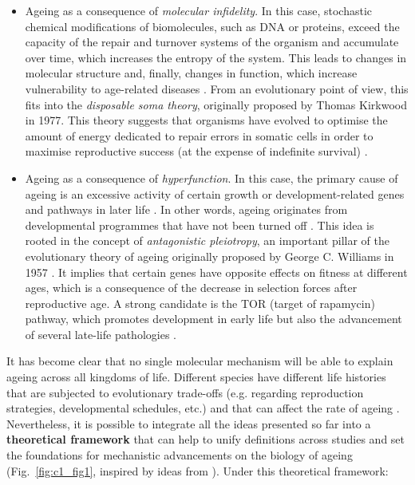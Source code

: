 \begin{itemize}
	
	\item Ageing as a consequence of \textit{molecular infidelity}. In this case, stochastic chemical modifications of biomolecules, such as DNA or proteins, exceed the capacity of the repair and turnover systems of the organism and accumulate over time, which increases the entropy of the system. This leads to changes in molecular structure and, finally, changes in function, which increase vulnerability to age-related diseases \cite{Hayflick2007,Hayflick2007a}. From an evolutionary point of view, this fits into the \textit{disposable soma theory}, originally proposed by Thomas Kirkwood in 1977. This theory suggests that organisms have evolved to optimise the amount of energy dedicated to repair errors in somatic cells in order to maximise reproductive success (at the expense of indefinite survival) \cite{Kirkwood1977,Kirkwood1991}. 
	
	\item Ageing as a consequence of \textit{hyperfunction}. In this case, the primary cause of ageing is an excessive activity of certain growth or development-related genes and pathways in later life \cite{Blagosklonny2006,Blagosklonny2010,DeMagalhaes2012,Gems2015}. In other words, ageing originates from developmental programmes that have not been turned off \cite{Blagosklonny2006}. This idea is rooted in the concept of \textit{antagonistic pleiotropy}, an important pillar of the evolutionary theory of ageing originally proposed by George C. Williams in 1957 \cite{Williams1957}. It implies that certain genes have opposite effects on fitness at different ages, which is a consequence of the decrease in selection forces after reproductive age. A strong candidate is the \acrshort{TOR} (target of rapamycin) pathway, which promotes development in early life but also the advancement of several late-life pathologies \cite{Blagosklonny2010}. 
	
\end{itemize}

It has become clear that no single molecular mechanism will be able to explain ageing across all kingdoms of life. Different species have different life histories that are subjected to evolutionary trade-offs (e.g. regarding reproduction strategies, developmental schedules, etc.) and that can affect the rate of ageing \cite{Jones2013,Ricklefs2010}. Nevertheless, it is possible to integrate all the ideas presented so far into a \textbf{theoretical framework} that can help to unify definitions across studies and set the foundations for mechanistic advancements on the biology of ageing (Fig.~\ref{fig:c1_fig1}, inspired by ideas from \cite{Hayflick2007,Gems2015,Peto1997,Stroustrup2016,Freund2019}). Under this theoretical framework: 

